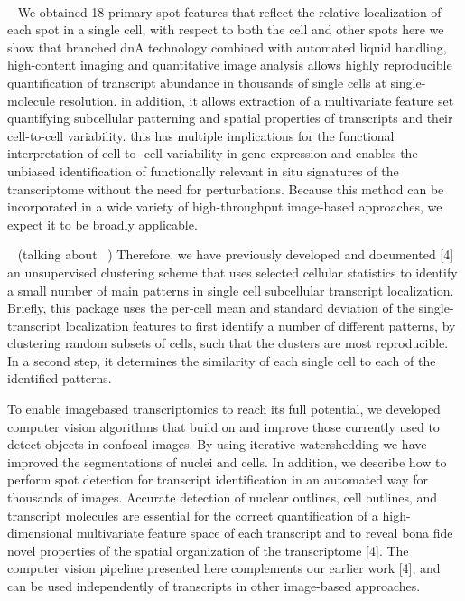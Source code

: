 ~\cite{tsanov_smifish_2016}
~\cite{samacoits_computational_2018}
~\cite{battich_image-based_2013}
~\cite{stoeger_computer_2015}

~\cite{battich_image-based_2013}
We obtained 18 primary spot features that reflect the
relative localization of each spot in a single cell, with respect to both the cell and other spots
here we show that branched dnA technology combined with automated liquid handling, high-content imaging and quantitative image analysis allows highly reproducible quantification of transcript abundance in thousands of single cells at single-molecule resolution.
in addition, it allows extraction of a multivariate feature set quantifying subcellular patterning and spatial properties of transcripts and their cell-to-cell variability. this has multiple implications for the functional interpretation of cell-to-
cell variability in gene expression and enables the unbiased identification of functionally relevant in situ signatures
of the transcriptome without the need for perturbations. Because this method can be incorporated in a wide variety of high-throughput image-based approaches, we expect it to be broadly applicable.

~\cite{stoeger_computer_2015}
(talking about ~\cite{battich_image-based_2013})
Therefore, we have previously developed and documented [4] an unsupervised
clustering scheme that uses selected cellular statistics to identify a small
number of main patterns in single cell subcellular transcript localization.
Briefly, this package uses the per-cell mean and standard deviation of the
single-transcript localization features to first identify a number of
different patterns, by clustering random subsets of cells, such that
the clusters are most reproducible. In a second step, it determines the
similarity of each single cell to each of the identified patterns.

To enable imagebased transcriptomics to reach its full potential, we developed
computer vision algorithms that build on and improve those currently used to
detect objects in confocal images. By using iterative watershedding we have
improved the segmentations of nuclei and cells. In addition, we describe how
to perform spot detection for transcript identification in an automated way for
thousands of images. Accurate detection of nuclear outlines, cell outlines, and
transcript molecules are essential for the correct quantification of a
high-dimensional multivariate feature space of each transcript and to reveal
bona fide novel properties of the spatial organization of the transcriptome [4].
The computer vision pipeline presented here complements our earlier work [4],
and can be used independently of transcripts in other image-based approaches.

